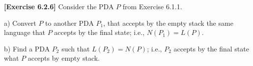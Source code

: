 \textbf{[Exercise 6.2.6]} Consider the PDA $P$ from Exercise 6.1.1.

a) Convert $P$ to another PDA $P_1$, that accepts by the empty stack the same language
that $P$ accepts by the final state; i.e., $N(P_1)=L(P)$.

b) Find a PDA $P_2$ such that $L(P_2)=N(P)$; i.e., $P_2$ accepts by the final state
what $P$ accepts by empty stack.